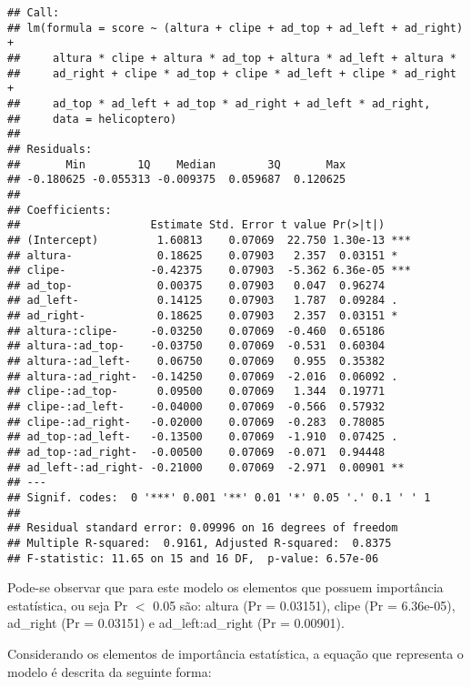 \begin{knitrout}
\color{fgcolor}\begin{kframe}
\begin{verbatim}
## Call:
## lm(formula = score ~ (altura + clipe + ad_top + ad_left + ad_right) + 
##     altura * clipe + altura * ad_top + altura * ad_left + altura * 
##     ad_right + clipe * ad_top + clipe * ad_left + clipe * ad_right + 
##     ad_top * ad_left + ad_top * ad_right + ad_left * ad_right, 
##     data = helicoptero)
## 
## Residuals:
##       Min        1Q    Median        3Q       Max 
## -0.180625 -0.055313 -0.009375  0.059687  0.120625 
## 
## Coefficients:
##                    Estimate Std. Error t value Pr(>|t|)    
## (Intercept)         1.60813    0.07069  22.750 1.30e-13 ***
## altura-             0.18625    0.07903   2.357  0.03151 *  
## clipe-             -0.42375    0.07903  -5.362 6.36e-05 ***
## ad_top-             0.00375    0.07903   0.047  0.96274    
## ad_left-            0.14125    0.07903   1.787  0.09284 .  
## ad_right-           0.18625    0.07903   2.357  0.03151 *  
## altura-:clipe-     -0.03250    0.07069  -0.460  0.65186    
## altura-:ad_top-    -0.03750    0.07069  -0.531  0.60304    
## altura-:ad_left-    0.06750    0.07069   0.955  0.35382    
## altura-:ad_right-  -0.14250    0.07069  -2.016  0.06092 .  
## clipe-:ad_top-      0.09500    0.07069   1.344  0.19771    
## clipe-:ad_left-    -0.04000    0.07069  -0.566  0.57932    
## clipe-:ad_right-   -0.02000    0.07069  -0.283  0.78085    
## ad_top-:ad_left-   -0.13500    0.07069  -1.910  0.07425 .  
## ad_top-:ad_right-  -0.00500    0.07069  -0.071  0.94448    
## ad_left-:ad_right- -0.21000    0.07069  -2.971  0.00901 ** 
## ---
## Signif. codes:  0 '***' 0.001 '**' 0.01 '*' 0.05 '.' 0.1 ' ' 1
## 
## Residual standard error: 0.09996 on 16 degrees of freedom
## Multiple R-squared:  0.9161,	Adjusted R-squared:  0.8375 
## F-statistic: 11.65 on 15 and 16 DF,  p-value: 6.57e-06
\end{verbatim}
\end{kframe}
\end{knitrout}

Pode-se observar que para este modelo os elementos que possuem importância estatística, ou seja Pr $<$ 0.05 são: altura (Pr = 0.03151), clipe (Pr = 6.36e-05), ad\_right (Pr = 0.03151) e ad\_left:ad\_right (Pr = 0.00901). 

Considerando os elementos de importância estatística, a equação que representa o modelo é descrita da seguinte forma:

